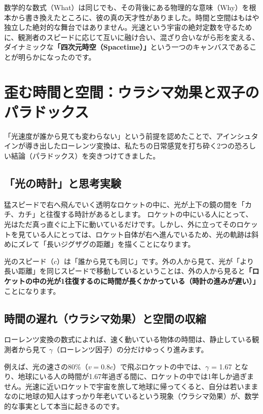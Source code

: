 数学的な数式（What）は同じでも、その背後にある物理的な意味（Why）を根本から書き換えたところに、彼の真の天才性がありました。時間と空間はもはや独立した絶対的な舞台ではありません。光速という宇宙の絶対定数を守るために、観測者のスピードに応じて互いに融け合い、混ざり合いながら形を変える、ダイナミックな\textbf{「四次元時空（Spacetime）」}という一つのキャンバスであることが明らかになったのです。

\section{歪む時間と空間：ウラシマ効果と双子のパラドックス}

「光速度が誰から見ても変わらない」という前提を認めたことで、アインシュタインが導き出したローレンツ変換は、私たちの日常感覚を打ち砕く2つの恐ろしい結論（パラドックス）を突きつけてきました。

\subsection{「光の時計」と思考実験}

猛スピードで右へ飛んでいく透明なロケットの中に、光が上下の鏡の間を「カチ、カチ」と往復する時計があるとします。 ロケットの中にいる人にとって、光はただ真っ直ぐに上下に動いているだけです。しかし、外に立ってそのロケットを見ている人にとっては、ロケット自体が右へ進んでいるため、光の軌跡は斜めにズレて「長いジグザグの距離」を描くことになります。

光のスピード（\(c\)）は「誰から見ても同じ」です。外の人から見て、光が「より長い距離」を同じスピードで移動しているということは、外の人から見ると\textbf{「ロケットの中の光が1往復するのに時間が長くかかっている（時計の進みが遅い）」}ことになります。

\subsection{時間の遅れ（ウラシマ効果）と空間の収縮}

ローレンツ変換の数式によれば、速く動いている物体の時間は、静止している観測者から見て \ensuremath{\gamma}（ローレンツ因子）の分だけゆっくり進みます。

例えば、光の速さの80\%（\(v = 0.8c\)）で飛ぶロケットの中では、\ensuremath{\gamma} = 1.67 となり、地球にいる人の時間が1.67年過ぎる間に、ロケットの中では1年しか過ぎません。光速に近いロケットで宇宙を旅して地球に帰ってくると、自分は若いままなのに地球の知人はすっかり年老いているという現象（ウラシマ効果）が、数学的な事実として本当に起きるのです。

